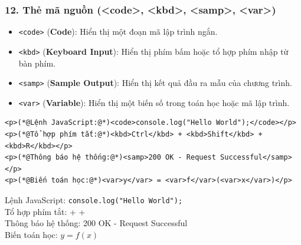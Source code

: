\documentclass[11pt,oneside]{book}
\newcommand{\codeinline}[1]{\textcolor{accentOrange}{\texttt{#1}}}
\begin{document}
\subsubsection{12. Thẻ mã nguồn (<code>, <kbd>, <samp>, <var>)}

\begin{itemize}[leftmargin=1.8em, itemsep=3pt, parsep=0pt]
    \item \codeinline{<code>} (\textbf{Code}): Hiển thị một đoạn mã lập trình ngắn.
    \item \codeinline{<kbd>} (\textbf{Keyboard Input}): Hiển thị phím bấm hoặc tổ hợp phím nhập từ bàn phím.
    \item \codeinline{<samp>} (\textbf{Sample Output}): Hiển thị kết quả đầu ra mẫu của chương trình.
    \item \codeinline{<var>} (\textbf{Variable}): Hiển thị một biến số trong toán học hoặc mã lập trình.
\end{itemize}

\begin{codeWindow}
\begin{lstlisting}[language=HTML5]
<p>(*@Lệnh JavaScript:@*)<code>console.log("Hello World");</code></p>
<p>(*@Tổ hợp phím tắt:@*)<kbd>Ctrl</kbd> + <kbd>Shift</kbd> + <kbd>R</kbd></p>
<p>(*@Thông báo hệ thống:@*)<samp>200 OK - Request Successful</samp></p>
<p>(*@Biến toán học:@*)<var>y</var> = <var>f</var>(<var>x</var>)</p>
\end{lstlisting}
\end{codeWindow}
\begin{tcolorbox}[
    enhanced,
    colback=white,
    colframe=primaryBlue!20,
    arc=6pt,
    boxrule=0.8pt,
    drop shadow=black!3!white,
    top=8pt, bottom=8pt, left=12pt, right=12pt,
    title={\sffamily\bfseries\scriptsize\color{codeComment} KẾT QUẢ HIỂN THỊ TRÊN TRÌNH DUYỆT (PROGRAMMING ELEMENTS PREVIEW)},
    coltitle=codeComment,
    colbacktitle=codeBg!80!white
]
Lệnh JavaScript: \codeinline{console.log("Hello World");}\\[4pt]
Tổ hợp phím tắt:  +  + \\[4pt]
Thông báo hệ thống: {\ttfamily\color{codeString} 200 OK - Request Successful}\\[4pt]
Biến toán học: $\mathit{y} = \mathit{f}(\mathit{x})$
\end{tcolorbox}
\end{document}
